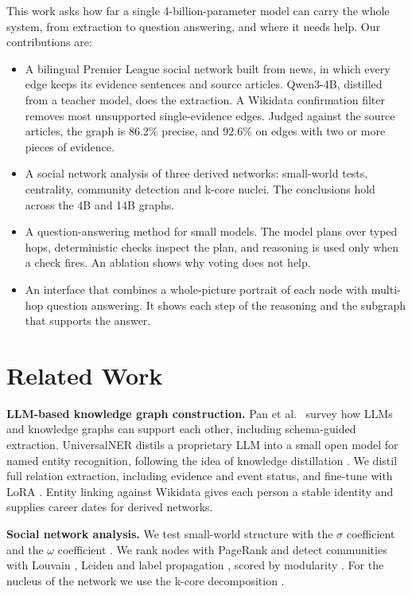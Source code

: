\documentclass[11pt]{article}
\begin{document}
This work asks how far a single 4-billion-parameter model can carry the whole system, from extraction to question answering, and where it needs help. Our contributions are:
\begin{itemize}
\item A bilingual Premier League social network built from news, in which every edge keeps its evidence sentences and source articles. Qwen3-4B, distilled from a teacher model, does the extraction. A Wikidata confirmation filter removes most unsupported single-evidence edges. Judged against the source articles, the graph is 86.2\% precise, and 92.6\% on edges with two or more pieces of evidence.
\item A social network analysis of three derived networks: small-world tests, centrality, community detection and k-core nuclei. The conclusions hold across the 4B and 14B graphs.
\item A question-answering method for small models. The model plans over typed hops, deterministic checks inspect the plan, and reasoning is used only when a check fires. An ablation shows why voting does not help.
\item An interface that combines a whole-picture portrait of each node with multi-hop question answering. It shows each step of the reasoning and the subgraph that supports the answer.
\end{itemize}

\section{Related Work}
\textbf{LLM-based knowledge graph construction.} Pan et al.~\cite{pan2024unifying} survey how LLMs and knowledge graphs can support each other, including schema-guided extraction. UniversalNER \cite{zhou2024universalner} distils a proprietary LLM into a small open model for named entity recognition, following the idea of knowledge distillation \cite{hinton2015distilling}. We distil full relation extraction, including evidence and event status, and fine-tune with LoRA \cite{hu2022lora}. Entity linking against Wikidata \cite{vrandecic2014wikidata} gives each person a stable identity and supplies career dates for derived networks.

\textbf{Social network analysis.} We test small-world structure \cite{watts1998collective} with the $\sigma$ coefficient \cite{humphries2008network} and the $\omega$ coefficient \cite{telesford2011ubiquity}. We rank nodes with PageRank \cite{page1999pagerank} and detect communities with Louvain \cite{blondel2008fast}, Leiden \cite{traag2019louvain} and label propagation \cite{raghavan2007near}, scored by modularity \cite{newman2006modularity}. For the nucleus of the network we use the k-core decomposition \cite{seidman1983network,batagelj2003m}.
\end{document}
